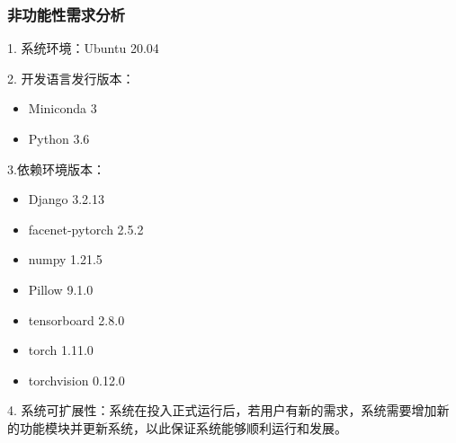 \subsubsection{非功能性需求分析}

1. 系统环境：Ubuntu 20.04

2. 开发语言发行版本：
\begin{itemize}
    \item Miniconda 3
    \item Python 3.6
\end{itemize}

3.依赖环境版本：
\begin{itemize}
    \item Django 3.2.13
    \item facenet-pytorch 2.5.2
    \item numpy 1.21.5
    \item Pillow 9.1.0
    \item tensorboard 2.8.0
    \item torch 1.11.0
    \item torchvision 0.12.0
\end{itemize}

4. 系统可扩展性：系统在投入正式运行后，若用户有新的需求，系统需要增加新的功能模块并更新系统，以此保证系统能够顺利运行和发展。






